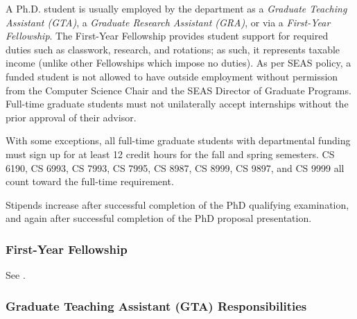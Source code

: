 A Ph.D. student is usually employed by the department as a
\emph{Graduate Teaching Assistant (GTA)}, a \emph{Graduate Research
Assistant (GRA)}, or via a \emph{First-Year Fellowship}. The First-Year
Fellowship provides student support for required duties such as
classwork, research, and rotations; as such, it represents taxable income
(unlike other Fellowships which impose no duties). As per SEAS policy, a
funded student is not allowed to have outside employment without
permission from the Computer Science Chair and the SEAS Director of
Graduate Programs. Full-time graduate students must not unilaterally
accept internships without the prior approval of their advisor.

With some exceptions, all full-time graduate students with departmental
funding must sign up for at least 12 credit hours for the fall and spring semesters. CS 6190, CS 6993, CS 7993, CS 7995, CS 8987, CS 8999,
CS 9897, and CS 9999 all count toward the full-time requirement.

Stipends increase after successful completion of the PhD qualifying
examination, and again after successful completion of the PhD proposal
presentation.

\hypertarget{first-year-fellowship}{
\subsubsection{\texorpdfstring{First-Year Fellowship}{First-Year Fellowship}}
\label{first-year-fellowship}
}

See .

\hypertarget{graduate-teaching-assistant-gta-responsibilities}{
\subsubsection{Graduate Teaching Assistant (GTA) Responsibilities}
\label{graduate-teaching-assistant-gta-responsibilities}
}

